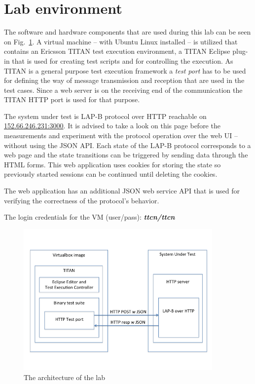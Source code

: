 \documentclass[a4paper]{article}
\begin{document}
\section{Lab environment}

The software and hardware components that are used during this lab can be seen on Fig.~\ref{fig:lab-arch}.
A virtual machine -- with Ubuntu Linux installed -- is utilized that contains an Ericsson TITAN test execution
environment,
a TITAN Eclipse plug-in that is used for creating test scripts and for controlling the execution. As TITAN is a general
purpose test execution framework a \emph{test port} has to be used for defining the way of message transmission and
reception that are used in the test cases. Since a web server is on the receiving end of the communication the TITAN
HTTP port is used for that purpose.

The system under test is LAP-B protocol over HTTP reachable on \url{152.66.246.231:3000}. It is advised to take a look
on this page before the measurements and experiment with the protocol operation over the web UI -- without using the
JSON API.
Each state of the LAP-B protocol corresponds to a web page and the state transitions can be triggered by sending data
through the HTML forms.
This web application uses cookies for storing the state so previously started sessions can be continued until deleting
the cookies.

The web application has an additional JSON web service API that is used for verifying the correctness of the protocol's
behavior.

The login credentials for the VM (user/pass): \textbf{\emph{ttcn/ttcn}}

\begin{figure}[!htb]
    \centering
    \includegraphics[width=0.9\textwidth]{figures/lab-arch.png}
    \caption{The architecture of the lab}
    \label{fig:lab-arch}
\end{figure}
\end{document}
